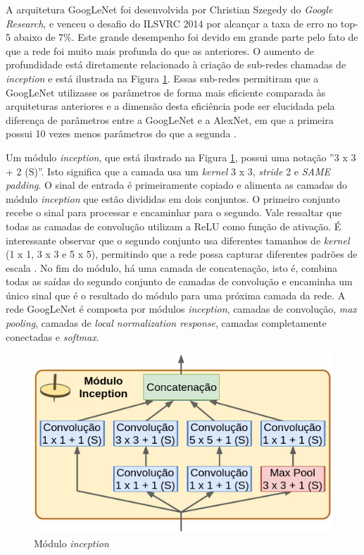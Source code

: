 A arquitetura GoogLeNet \citep{szegedy2015going} foi desenvolvida por Christian Szegedy do \textit{Google Research}, e venceu o desafio do ILSVRC 2014 por alcançar a taxa de erro no top-5 abaixo de 7\%. Este grande desempenho foi devido em grande parte pelo fato de que a rede foi muito mais profunda do que as anteriores. O aumento de profundidade está diretamente relacionado à criação de sub-redes chamadas de \textit{inception} e está ilustrada na Figura \ref{fig:inception}. Essas sub-redes permitiram que a GoogLeNet utilizasse os parâmetros de forma mais eficiente comparada às arquiteturas anteriores e a dimensão desta eficiência pode ser elucidada pela diferença de parâmetros entre a GoogLeNet e a AlexNet, em que a primeira possui 10 vezes menos parâmetros do que a segunda \citep{geron2017hands}. 

Um módulo \textit{inception}, que está ilustrado na Figura \ref{fig:inception}, possui uma notação ''3 x 3 + 2 (S)''. Isto significa que a camada usa um \textit{kernel} 3 x 3, \textit{stride} 2 e \textit{SAME padding}. O sinal de entrada é primeiramente copiado e alimenta as camadas do módulo \textit{inception} que estão divididas em dois conjuntos. O primeiro conjunto recebe o sinal para processar e encaminhar para o segundo. Vale ressaltar que todas as camadas de convolução utilizam a ReLU como função de ativação. É interessante observar que o segundo conjunto usa diferentes tamanhos de \textit{kernel} (1 x 1, 3 x 3 e 5 x 5), permitindo que a rede possa capturar diferentes padrões de escala \citep{geron2017hands}. No fim do módulo, há uma camada de concatenação, isto é, combina todas as saídas do segundo conjunto de camadas de convolução e encaminha um único sinal que é o resultado do módulo para uma próxima camada da rede. A rede GoogLeNet é composta por módulos \textit{inception}, camadas de convolução, \textit{max pooling}, camadas de \textit{local normalization response}, camadas completamente conectadas e \textit{softmax}.


\begin{figure}
\centering
\includegraphics[scale=0.6]{figuras/inception.png}
\caption{Módulo \textit{inception}}
\label{fig:inception}
\end{figure}


